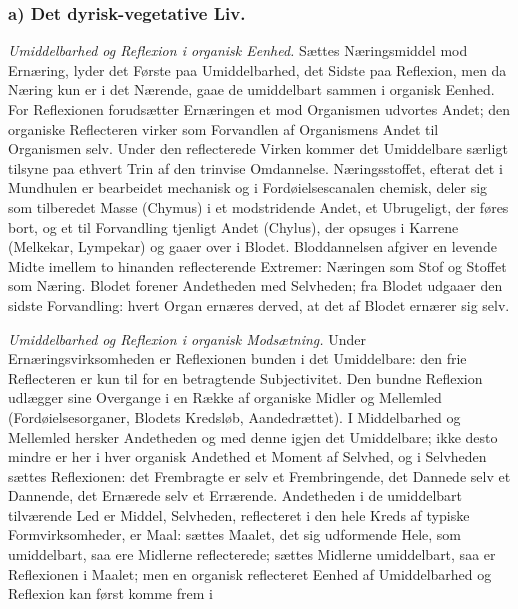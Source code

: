 \documentclass[11pt]{book}
\newcommand{\opage}[1]{\marginnote{\footnotesize\textit{[#1]}}}
\begin{document}
\subsubsection*{a) Det dyrisk-vegetative Liv.}

\emph{Umiddelbarhed og Reflexion i organisk Eenhed.} Sættes
Næringsmiddel mod Ernæring, lyder det Første paa Umiddelbarhed, det
Sidste paa Reflexion, men da Næring kun er i det Nærende, gaae de
umiddelbart sammen i organisk Eenhed. For Reflexionen forudsætter
Ernæringen et mod Organismen udvortes Andet; den organiske
Reflecteren virker som Forvandlen af Organismens Andet til Organismen
selv. Under den reflecterede Virken kommer det Umiddelbare særligt
tilsyne paa ethvert Trin af den trinvise Omdannelse. Næringsstoffet,
efterat det i Mundhulen er bearbeidet mechanisk og i
Fordøielsescanalen chemisk, deler sig som tilberedet Masse (Chymus) i
et modstridende Andet, et Ubrugeligt, der føres bort, og et til
Forvandling
\opage{272} \setcounter{footnote}{0}%
tjenligt Andet (Chylus), der opsuges i Karrene
(Melkekar, Lympekar) og gaaer over i Blodet. Bloddannelsen afgiver en
levende Midte imellem to hinanden reflecterende Extremer: Næringen som
Stof og Stoffet som Næring. Blodet forener Andetheden med Selvheden;
fra Blodet udgaaer den sidste Forvandling: hvert Organ ernæres derved,
at det af Blodet ernærer sig selv.

\emph{Umiddelbarhed og Reflexion i organisk Modsætning.} Under
Ernæringsvirksomheden er Reflexionen bunden i det Umiddelbare: den
frie Reflecteren er kun til for en betragtende Subjectivitet. Den
bundne Reflexion udlægger sine Overgange i en Række af organiske
Midler og Mellemled (Fordøielsesorganer, Blodets Kredsløb,
Aandedrættet). I Middelbarhed og Mellemled hersker Andetheden og med
denne igjen det Umiddelbare; ikke desto mindre er her i hver organisk
Andethed et Moment af Selvhed, og i Selvheden sættes Reflexionen: det
Frembragte er selv et Frembringende, det Dannede selv et Dannende,
det Ernærede selv et Errærende. Andetheden i de umiddelbart
tilværende Led er Middel, Selvheden, reflecteret i den hele Kreds af
typiske Formvirksomheder, er Maal: sættes Maalet, det sig udformende
Hele, som umiddelbart, saa ere Midlerne reflecterede; sættes Midlerne
umiddelbart, saa er Reflexionen i Maalet; men en organisk reflecteret
Eenhed af Umiddelbarhed og Reflexion kan først komme frem i
\end{document}
